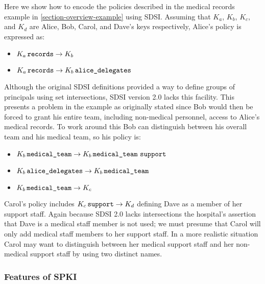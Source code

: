 Here we show how to encode the policies described in the medical records
example in \autoref{section-overview-example} using SDSI. Assuming that
$K_a$, $K_b$, $K_c$, and $K_d$ are Alice, Bob, Carol, and Dave's keys
respectively, Alice's policy is expressed as:
\begin{itemize}
\item $K_a\, \text{\tt records} \rightarrow K_b$
\item $K_a\, \text{\tt records} \rightarrow K_b\, \text{\tt alice\_delegates}$
\end{itemize}
Although the original SDSI definitions provided a way to define groups of
principals using set intersections, SDSI version 2.0 lacks this facility.
This presents a problem in the example as originally stated since Bob would
then be forced to grant his entire team, including non-medical personnel,
access to Alice's medical records. To work around this Bob can distinguish
between his overall team and his medical team, so his policy is:
\begin{itemize}
\item $K_b\, \text{\tt medical\_team} \rightarrow K_b\, \text{\tt
  medical\_team}\,\, \text{\tt support}$
\item $K_b\, \text{\tt alice\_delegates} \rightarrow K_b\, \text{\tt
  medical\_team}$
\item $K_b\, \text{\tt medical\_team} \rightarrow K_c$
\end{itemize}
Carol's policy includes $K_c\, \text{\tt support} \rightarrow K_d$ defining
Dave as a member of her support staff. Again because SDSI 2.0 lacks
intersections the hospital's assertion that Dave is a medical staff member
is not used; we must presume that Carol will only add medical staff members
to her support staff. In a more realistic situation Carol may want to
distinguish between her medical support staff and her non-medical support
staff by using two distinct names.

\subsubsection{Features of SPKI}

